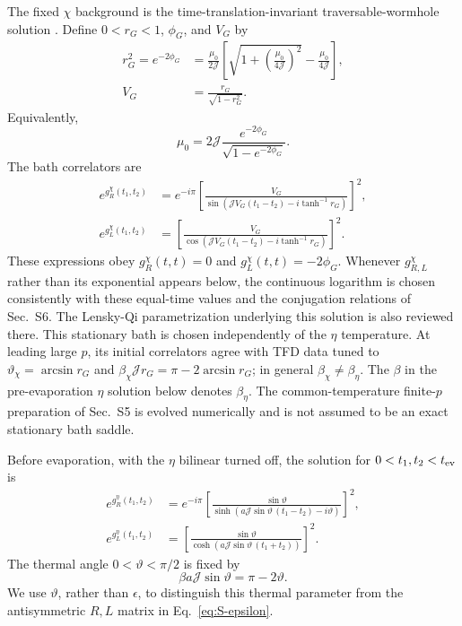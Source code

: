 \documentclass[11pt,a4paper]{article}
\begin{document}
The fixed \(\chi\) background is the time-translation-invariant
traversable-wormhole solution
\cite{maldacena2018eternal,lensky2021rescuing}. Define
\(0<r_G<1\), \(\phi_G\), and \(V_G\) by
\begin{equation}
\begin{aligned}
r_G^2
=
e^{-2\phi_G}
&=
\frac{\mu_0}{2\mathcal J}
\left[
\sqrt{1+\left(\frac{\mu_0}{4\mathcal J}\right)^2}
-
\frac{\mu_0}{4\mathcal J}
\right],
\\
V_G
&=
\frac{r_G}{\sqrt{1-r_G^2}} .
\end{aligned}
\label{eq:S3-bath-parameters}
\end{equation}
Equivalently,
\[
\mu_0
=
2\mathcal J
\frac{e^{-2\phi_G}}{\sqrt{1-e^{-2\phi_G}}}.
\]
The bath correlators are
\begin{equation}
\begin{aligned}
e^{g^\chi_R(t_1,t_2)}
&=
e^{-i\pi}
\left[
\frac{V_G}{
\sin\left(
\mathcal J V_G(t_1-t_2)
-i\tanh^{-1}r_G
\right)}
\right]^2,
\\
e^{g^\chi_L(t_1,t_2)}
&=
\left[
\frac{V_G}{
\cos\left(
\mathcal J V_G(t_1-t_2)
-i\tanh^{-1}r_G
\right)}
\right]^2 .
\end{aligned}
\label{eq:S3-bath-solution}
\end{equation}
These expressions obey
\(g^\chi_R(t,t)=0\) and
\(g^\chi_L(t,t)=-2\phi_G\). Whenever \(g^\chi_{R,L}\) rather than its
exponential appears below, the continuous logarithm is chosen consistently
with these equal-time values and the conjugation relations of Sec.~S6. The
Lensky-Qi parametrization underlying this solution is also reviewed there.
This stationary bath is chosen independently of the \(\eta\) temperature.
At leading large \(p\), its initial correlators agree with TFD data tuned to
\(\vartheta_\chi=\arcsin r_G\) and
\(\beta_\chi\mathcal J r_G=\pi-2\arcsin r_G\); in general
\(\beta_\chi\ne\beta_\eta\). The \(\beta\) in the pre-evaporation
\(\eta\) solution below denotes \(\beta_\eta\). The common-temperature
finite-\(p\) preparation of Sec.~S5 is evolved numerically and is not
assumed to be an exact stationary bath saddle.

Before evaporation, with the \(\eta\) bilinear turned off, the solution for
\(0<t_1,t_2<t_{\rm ev}\) is
\begin{equation}
\begin{aligned}
e^{g^\eta_R(t_1,t_2)}
&=
e^{-i\pi}
\left[
\frac{\sin\vartheta}{
\sinh\left(
a\mathcal J\sin\vartheta\,(t_1-t_2)
-i\vartheta
\right)}
\right]^2,
\\
e^{g^\eta_L(t_1,t_2)}
&=
\left[
\frac{\sin\vartheta}{
\cosh\left(
a\mathcal J\sin\vartheta\,(t_1+t_2)
\right)}
\right]^2 .
\end{aligned}
\label{eq:S3-eta-pre}
\end{equation}
The thermal angle \(0<\vartheta<\pi/2\) is fixed by
\begin{equation}
\beta a\mathcal J\sin\vartheta
=
\pi-2\vartheta .
\label{eq:S3-thermal-angle}
\end{equation}
We use \(\vartheta\), rather than \(\epsilon\), to distinguish this thermal
parameter from the antisymmetric \(R,L\) matrix in
Eq.~\eqref{eq:S-epsilon}.
\end{document}
